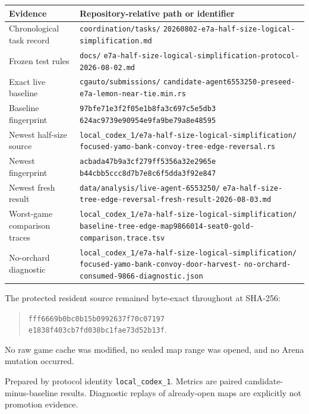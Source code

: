 \documentclass[10pt,a4paper]{article}
\begin{document}
\begin{tabularx}{\textwidth}{@{}p{42mm}Y@{}}
\toprule
\textbf{Evidence} & \textbf{Repository-relative path or identifier} \\
\midrule
Chronological task record & \texttt{coordination/tasks/}\newline
  \texttt{20260802-e7a-half-size-logical-simplification.md} \\
Frozen test rules & \texttt{docs/}\newline
  \texttt{e7a-half-size-logical-simplification-protocol-2026-08-02.md} \\
Exact live baseline & \texttt{cgauto/submissions/}\newline
  \texttt{candidate-agent6553250-preseed-e7a-lemon-near-tie.min.rs} \\
Baseline fingerprint & \scriptsize\texttt{97bfe71e3f2f05e1b8fa3c697c5e5db3}\newline
  \texttt{624ac9739e90954e9fa9be79a8e48595} \\
Newest half-size source & \texttt{local\_codex\_1/e7a-half-size-logical-simplification/}\newline
  \texttt{focused-yamo-bank-convoy-tree-edge-reversal.rs} \\
Newest fingerprint & \scriptsize\texttt{acbada47b9a3cf279ff5356a32e2965e}\newline
  \texttt{b44cbb5ccc8d7b7e8c6f5dda3f92e847} \\
Newest fresh result & \texttt{data/analysis/live-agent-6553250/}\newline
  \texttt{e7a-half-size-tree-edge-reversal-fresh-result-2026-08-03.md} \\
Worst-game comparison traces & \texttt{local\_codex\_1/e7a-half-size-logical-simplification/}\newline
  \texttt{baseline-tree-edge-map9866014-seat0-gold-}\newline
  \texttt{comparison.trace.tsv} \\
No-orchard diagnostic & \texttt{local\_codex\_1/e7a-half-size-logical-simplification/}\newline
  \texttt{focused-yamo-bank-convoy-door-harvest-}\newline
  \texttt{no-orchard-consumed-9866-diagnostic.json} \\
\bottomrule
\end{tabularx}

The protected resident source remained byte-exact throughout at SHA-256:
\begin{quote}
\small\texttt{fff6669b0bc0b15b0992637f70c07197}\newline
\texttt{e1838f403cb7fd038bc1fae73d52b13f}.
\end{quote}
No raw game cache was modified, no sealed map range was opened, and no Arena mutation occurred.

\vfill
{\small\color{muted}Prepared by protocol identity \texttt{local\_codex\_1}. Metrics are paired
candidate-minus-baseline results. Diagnostic replays of already-open maps are explicitly not
promotion evidence.}
\end{document}
